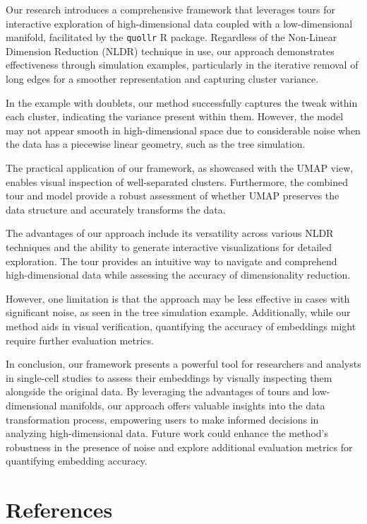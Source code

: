 \documentclass[
  12pt]{article}
\begin{document}
Our research introduces a comprehensive framework that leverages tours
for interactive exploration of high-dimensional data coupled with a
low-dimensional manifold, facilitated by the \texttt{quollr} R package.
Regardless of the Non-Linear Dimension Reduction (NLDR) technique in
use, our approach demonstrates effectiveness through simulation
examples, particularly in the iterative removal of long edges for a
smoother representation and capturing cluster variance.

In the example with doublets, our method successfully captures the tweak
within each cluster, indicating the variance present within them.
However, the model may not appear smooth in high-dimensional space due
to considerable noise when the data has a piecewise linear geometry,
such as the tree simulation.

The practical application of our framework, as showcased with the UMAP
view, enables visual inspection of well-separated clusters. Furthermore,
the combined tour and model provide a robust assessment of whether UMAP
preserves the data structure and accurately transforms the data.

The advantages of our approach include its versatility across various
NLDR techniques and the ability to generate interactive visualizations
for detailed exploration. The tour provides an intuitive way to navigate
and comprehend high-dimensional data while assessing the accuracy of
dimensionality reduction.

However, one limitation is that the approach may be less effective in
cases with significant noise, as seen in the tree simulation example.
Additionally, while our method aids in visual verification, quantifying
the accuracy of embeddings might require further evaluation metrics.

In conclusion, our framework presents a powerful tool for researchers
and analysts in single-cell studies to assess their embeddings by
visually inspecting them alongside the original data. By leveraging the
advantages of tours and low-dimensional manifolds, our approach offers
valuable insights into the data transformation process, empowering users
to make informed decisions in analyzing high-dimensional data. Future
work could enhance the method's robustness in the presence of noise and
explore additional evaluation metrics for quantifying embedding
accuracy.

\hypertarget{references}{%
\section*{References}\label{references}}

\renewcommand{\bibsection}{}


\newpage{}
\end{document}

